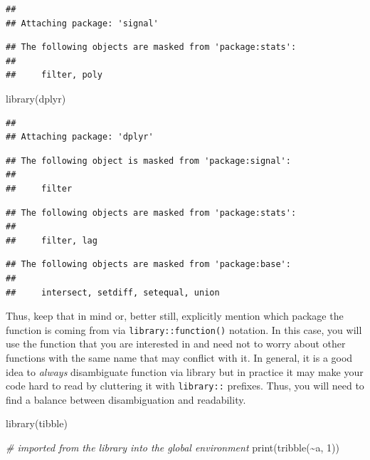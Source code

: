 \documentclass[
]{book}
\newenvironment{Shaded}{\begin{snugshade}}{\end{snugshade}}
\newcommand{\CommentTok}[1]{\textcolor[rgb]{0.56,0.35,0.01}{\textit{#1}}}
\newcommand{\DecValTok}[1]{\textcolor[rgb]{0.00,0.00,0.81}{#1}}
\newcommand{\FunctionTok}[1]{\textcolor[rgb]{0.00,0.00,0.00}{#1}}
\newcommand{\NormalTok}[1]{#1}
\newcommand{\SpecialCharTok}[1]{\textcolor[rgb]{0.00,0.00,0.00}{#1}}
\begin{document}
\begin{verbatim}
## 
## Attaching package: 'signal'
\end{verbatim}

\begin{verbatim}
## The following objects are masked from 'package:stats':
## 
##     filter, poly
\end{verbatim}

\begin{Shaded}
\begin{Highlighting}[]
\FunctionTok{library}\NormalTok{(dplyr)}
\end{Highlighting}
\end{Shaded}

\begin{verbatim}
## 
## Attaching package: 'dplyr'
\end{verbatim}

\begin{verbatim}
## The following object is masked from 'package:signal':
## 
##     filter
\end{verbatim}

\begin{verbatim}
## The following objects are masked from 'package:stats':
## 
##     filter, lag
\end{verbatim}

\begin{verbatim}
## The following objects are masked from 'package:base':
## 
##     intersect, setdiff, setequal, union
\end{verbatim}

Thus, keep that in mind or, better still, explicitly mention which package the function is coming from via \texttt{library::function()} notation. In this case, you will use the function that you are interested in and need not to worry about other functions with the same name that may conflict with it. In general, it is a good idea to \emph{always} disambiguate function via library but in practice it may make your code hard to read by cluttering it with \texttt{library::} prefixes. Thus, you will need to find a balance between disambiguation and readability.

\begin{Shaded}
\begin{Highlighting}[]
\FunctionTok{library}\NormalTok{(tibble)}

\CommentTok{\# imported from the library into the global environment}
\FunctionTok{print}\NormalTok{(}\FunctionTok{tribble}\NormalTok{(}\SpecialCharTok{\textasciitilde{}}\NormalTok{a, }\DecValTok{1}\NormalTok{))}
\end{Highlighting}
\end{Shaded}
\end{document}
